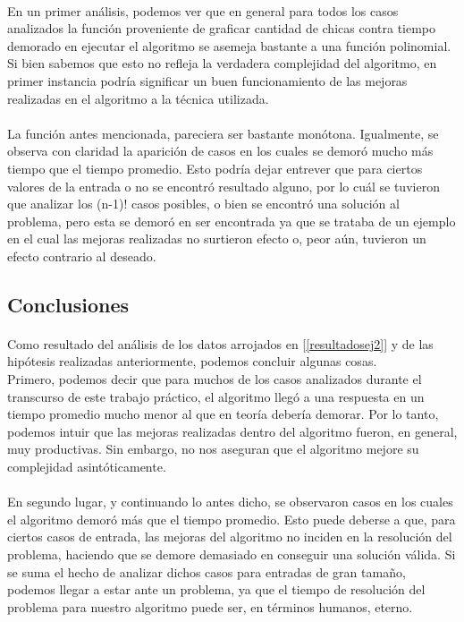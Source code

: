 \paragraph{}
En un primer análisis, podemos ver que en general para todos los casos analizados la función proveniente de graficar cantidad de chicas contra tiempo demorado en ejecutar el algoritmo se asemeja bastante a una función polinomial. Si bien sabemos que esto no refleja la verdadera complejidad del algoritmo, en primer instancia podría significar un buen funcionamiento de las mejoras realizadas en el algoritmo a la técnica utilizada.

\paragraph{}
La función antes mencionada, pareciera ser bastante monótona. Igualmente, se observa con claridad la aparición de casos en los cuales se demoró mucho más tiempo que el tiempo promedio. Esto podría dejar entrever que para ciertos valores de la entrada o no se encontró resultado alguno, por lo cuál se tuvieron que analizar los (n-1)! casos posibles, o bien se encontró una solución al problema, pero esta se demoró en ser encontrada ya que se trataba de un ejemplo en el cual las mejoras realizadas no surtieron efecto o, peor aún, tuvieron un efecto contrario al deseado.


\subsection{Conclusiones}

\paragraph{}
Como resultado del análisis de los datos arrojados en [\ref{resultadosej2}] y de las hipótesis realizadas anteriormente, podemos concluir algunas cosas.\\
Primero, podemos decir que para muchos de los casos analizados durante el transcurso de este trabajo práctico, el algoritmo llegó a una respuesta en un tiempo promedio mucho menor al que en teoría debería demorar. Por lo tanto, podemos intuir que las mejoras realizadas dentro del algoritmo fueron, en general, muy productivas. Sin embargo, no nos aseguran que el algoritmo mejore su complejidad asintóticamente.

\paragraph{}
En segundo lugar, y continuando lo antes dicho, se observaron casos en los cuales el algoritmo demoró más que el tiempo promedio. Esto puede deberse a que, para ciertos casos de entrada, las mejoras del algoritmo no inciden en la resolución del problema, haciendo que se demore demasiado en conseguir una solución válida. Si se suma el hecho de analizar dichos casos para entradas de gran tamaño, podemos llegar a estar ante un problema, ya que el tiempo de resolución del problema para nuestro algoritmo puede ser, en términos humanos, eterno.

